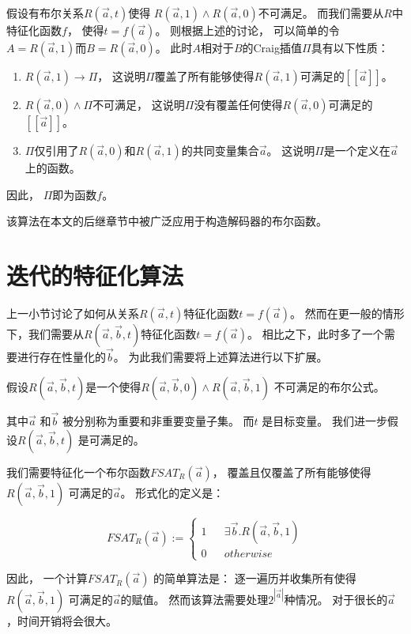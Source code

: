 假设有布尔关系$R(\vec{a},t)$使得
$R(\vec{a},1)\wedge R(\vec{a},0)$不可满足。
而我们需要从$R$中特征化函数$f$，
使得$t=f(\vec{a})$。
则根据上述的讨论，
可以简单的令$A=R(\vec{a},1)$而$B=R(\vec{a},0)$。
此时$A$相对于$B$的Craig插值$\Pi$具有以下性质：

\begin{enumerate}
\item $R(\vec{a},1)\to \Pi$，
这说明$\Pi$覆盖了所有能够使得$R(\vec{a},1)$可满足的$[\![\vec{a}]\!]$。
\item $R(\vec{a},0)\wedge \Pi$不可满足，
这说明$\Pi$没有覆盖任何使得$R(\vec{a},0)$可满足的$[\![\vec{a}]\!]$。
\item $\Pi$仅引用了$R(\vec{a},0)$和$R(\vec{a},1)$的共同变量集合$\vec{a}$。
这说明$\Pi$是一个定义在$\vec{a}$上的函数。
\end{enumerate}

因此，
$\Pi$即为函数$f$。

该算法在本文的后继章节中被广泛应用于构造解码器的布尔函数。


\section{迭代的特征化算法}\label{sec_iterativecraig}
上一小节讨论了如何从关系$R(\vec{a},t)$特征化函数$t=f(\vec{a})$。
然而在更一般的情形下，我们需要从$R(\vec{a},\vec{b},t)$特征化函数$t=f(\vec{a})$。
相比之下，此时多了一个需要进行存在性量化的$\vec{b}$。
为此我们需要将上述算法进行以下扩展。

假设$R(\vec{a},\vec{b},t)$是一个使得$R(\vec{a},\vec{b},0)\wedge R(\vec{a},\vec{b},1)$ 不可满足的布尔公式。

其中$\vec{a}$ 和$\vec{b}$ 被分别称为重要和非重要变量子集。
而$t$ 是目标变量。
我们进一步假设$R(\vec{a},\vec{b},t)$ 是可满足的。

我们需要特征化一个布尔函数$FSAT_R(\vec{a})$，
覆盖且仅覆盖了所有能够使得$R(\vec{a},\vec{b},1)$ 可满足的$\vec{a}$。
形式化的定义是：

\begin{equation}\label{fchar}
FSAT_R(\vec{a}):=
\left\{
\begin{array}{rcl}
1 & & \exists\vec{b}.R(\vec{a},\vec{b},1) \\
0 & & otherwise
\end{array}
\right.
\end{equation}

因此，
一个计算$FSAT_R(\vec{a})$ 的简单算法是：
逐一遍历并收集所有使得$R(\vec{a},\vec{b},1)$ 可满足的$\vec{a}$的赋值。
然而该算法需要处理$2^{|\vec{a}|}$种情况。
对于很长的$\vec{a}$，时间开销将会很大。

